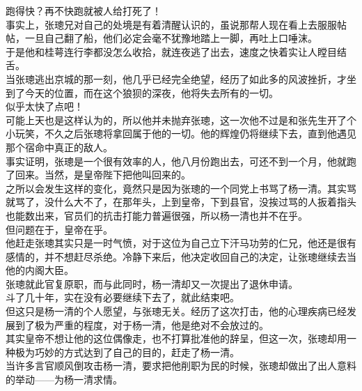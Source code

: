 \begin{multicols}{\theparacolNo}
跑得快？再不快跑就被人给打死了！\\

事实上，张璁兄对自己的处境是有着清醒认识的，虽说那帮人现在看上去服服帖帖，一旦自己翻了船，他们必定会毫不犹豫地踏上一脚，再吐上口唾沫。\\

于是他和桂萼连行李都没怎么收拾，就连夜逃了出去，速度之快着实让人瞠目结舌。\\

当张璁逃出京城的那一刻，他几乎已经完全绝望，经历了如此多的风波挫折，才坐到了今天的位置，而在这个狼狈的深夜，他将失去所有的一切。\\

似乎太快了点吧！\\

可能上天也是这样认为的，所以他并未抛弃张璁，这一次他不过是和张先生开了个小玩笑，不久之后张璁将拿回属于他的一切。他的辉煌仍将继续下去，直到他遇见那个宿命中真正的敌人。\\

事实证明，张璁是一个很有效率的人，他八月份跑出去，可还不到一个月，他就跑了回来。当然，是皇帝陛下把他叫回来的。\\

之所以会发生这样的变化，竟然只是因为张璁的一个同党上书骂了杨一清。其实骂就骂了，没什么大不了，在那年头，上到皇帝，下到县官，没挨过骂的人扳着指头也能数出来，官员们的抗击打能力普遍很强，所以杨一清也并不在乎。\\

但问题在于，皇帝在乎。\\

他赶走张璁其实只是一时气愤，对于这位为自己立下汗马功劳的仁兄，他还是很有感情的，并不想赶尽杀绝。冷静下来后，他决定收回自己的决定，让张璁继续去当他的内阁大臣。\\

张璁就此官复原职，而与此同时，杨一清却又一次提出了退休申请。\\

斗了几十年，实在没有必要继续下去了，就此结束吧。\\

但这只是杨一清的个人愿望，与张璁无关。经历了这次打击，他的心理疾病已经发展到了极为严重的程度，对于杨一清，他是绝对不会放过的。\\

其实皇帝不想让他的这位偶像走，也不打算批准他的辞呈，但这一次，张璁却用一种极为巧妙的方式达到了自己的目的，赶走了杨一清。\\

当许多言官顺风倒攻击杨一清，要求把他削职为民的时候，张璁却做出了出人意料的举动——为杨一清求情。\\


\end{multicols}
